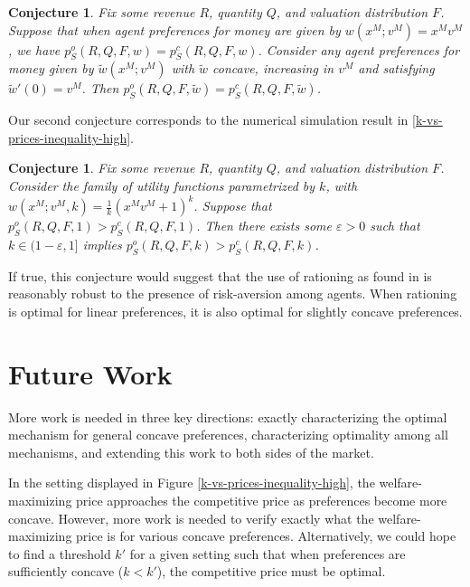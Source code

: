 \documentclass[AER]{AEA}
\newtheorem{conj}[theorem]{Conjecture}
\begin{document}
\begin{conj}
    \label{conj:competitive-price}
    Fix some revenue $R$, quantity $Q$, and valuation distribution $F$. Suppose that when agent preferences for money are given by $w(x^M; v^M) = x^M v^M$, we have $p_S^o(R, Q, F, w) = p_S^c(R, Q, F, w)$. Consider any agent preferences for money given by $\tilde{w}(x^M; v^M)$ with $\tilde{w}$ concave, increasing in $v^M$ and satisfying $\tilde{w}'(0) = v^M$. Then $p_S^o(R, Q, F, \tilde{w}) = p_S^c(R, Q, F, \tilde{w})$.
\end{conj}

Our second conjecture corresponds to the numerical simulation result in \ref{k-vs-prices-inequality-high}.

\begin{conj}
    \label{conj:rationing-robust}
    Fix some revenue $R$, quantity $Q$, and valuation distribution $F$. Consider the family of utility functions parametrized by $k$, with $w(x^M; v^M, k) = \frac{1}{k}(x^M v^M + 1)^k$. Suppose that $p_S^o(R, Q, F, 1) > p_S^c(R, Q, F, 1)$. Then there exists some $\varepsilon > 0$ such that $k \in (1-\varepsilon, 1]$ implies $p_S^o(R, Q, F, k) > p_S^c(R, Q, F, k)$. 
\end{conj}

If true, this conjecture would suggest that the use of rationing as found in \cite{dworczak-2020} is reasonably robust to the presence of risk-aversion among agents. When rationing is optimal for linear preferences, it is also optimal for slightly concave preferences.

\section{Future Work}
\label{sec:future-work}

More work is needed in three key directions: exactly characterizing the optimal mechanism for general concave preferences, characterizing optimality among all mechanisms, and extending this work to both sides of the market.

In the setting displayed in Figure \ref{k-vs-prices-inequality-high}, the welfare-maximizing price approaches the competitive price as preferences become more concave. However, more work is needed to verify exactly what the welfare-maximizing price is for various concave preferences. Alternatively, we could hope to find a threshold $k'$ for a given setting such that when preferences are sufficiently concave ($k < k'$), the competitive price must be optimal.
\end{document}
